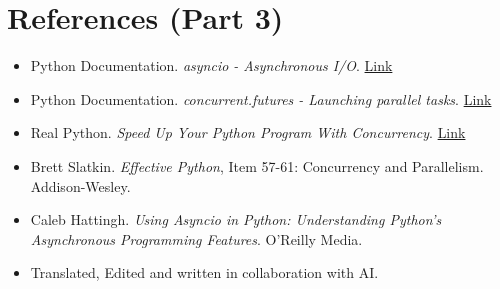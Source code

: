 \documentclass[12pt,letterpaper]{article}
\begin{document}
\section{References (Part 3)}
\begin{itemize}
    \item Python Documentation. \textit{asyncio - Asynchronous I/O}. \href{https://docs.python.org/3/library/asyncio.html}{Link}
    
    \item Python Documentation. \textit{concurrent.futures - Launching parallel tasks}. \href{https://docs.python.org/3/library/concurrent.futures.html}{Link}
    
    \item Real Python. \textit{Speed Up Your Python Program With Concurrency}. \href{https://realpython.com/python-concurrency/}{Link}
    
    \item Brett Slatkin. \textit{Effective Python}, Item 57-61: Concurrency and Parallelism. Addison-Wesley.
    
    \item Caleb Hattingh. \textit{Using Asyncio in Python: Understanding Python's Asynchronous Programming Features}. O'Reilly Media.
    
    \item Translated, Edited and written in collaboration with AI.
\end{itemize}
\end{document}
